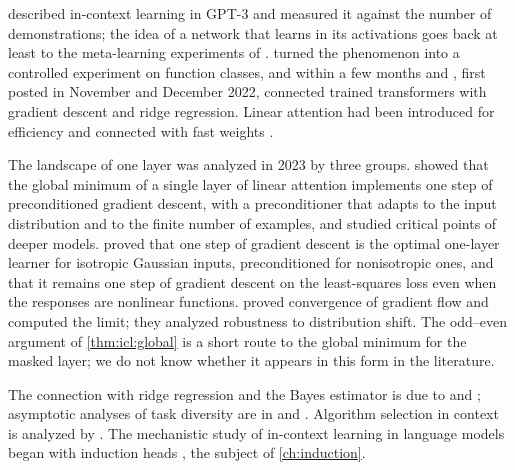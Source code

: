 \begin{refsection}
\notesandrefs
\Textcite{BrownEtAl2020} described in-context learning in GPT-3 and measured it against the number of demonstrations; the idea of a network that learns in its activations goes back at least to the meta-learning experiments of \textcite{HochreiterEtAl2001}. \Textcite{GargEtAl2022} turned the phenomenon into a controlled experiment on function classes, and within a few months \textcite{AkyurekEtAl2023} and \textcite{VonOswaldEtAl2023}, first posted in November and December 2022, connected trained transformers with gradient descent and ridge regression. Linear attention had been introduced for efficiency \parencite{KatharopoulosEtAl2020} and connected with fast weights \parencite{SchlagEtAl2021}.

The landscape of one layer was analyzed in 2023 by three groups. \Textcite{AhnEtAl2023} showed that the global minimum of a single layer of linear attention implements one step of preconditioned gradient descent, with a preconditioner that adapts to the input distribution and to the finite number of examples, and studied critical points of deeper models. \Textcite{MahankaliEtAl2024} proved that one step of gradient descent is the optimal one-layer learner for isotropic Gaussian inputs, preconditioned for nonisotropic ones, and that it remains one step of gradient descent on the least-squares loss even when the responses are nonlinear functions. \Textcite{ZhangFreiBartlett2024} proved convergence of gradient flow and computed the limit; they analyzed robustness to distribution shift. The odd--even argument of \cref{thm:icl:global} is a short route to the global minimum for the masked layer; we do not know whether it appears in this form in the literature.

The connection with ridge regression and the Bayes estimator is due to \textcite{AkyurekEtAl2023} and \textcite{RaventosEtAl2023}; asymptotic analyses of task diversity are in \textcite{WuEtAl2024} and \textcite{LuEtAl2025}. Algorithm selection in context is analyzed by \textcite{BaiEtAl2023}. The mechanistic study of in-context learning in language models began with induction heads \parencite{OlssonEtAl2022}, the subject of \cref{ch:induction}.


\end{refsection}
